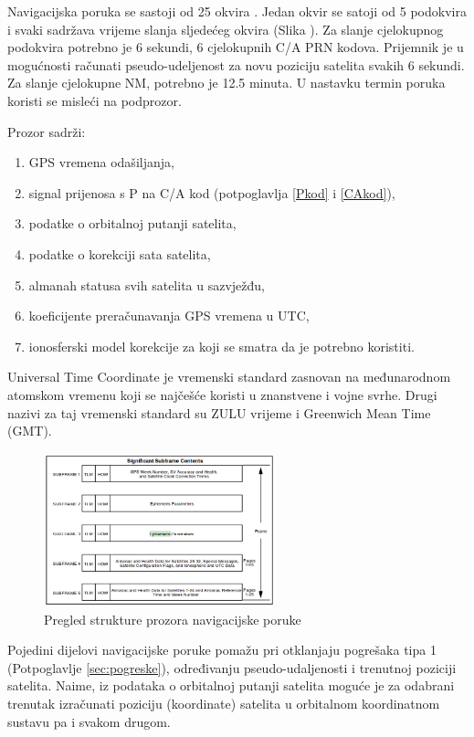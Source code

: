 \documentclass[a4paper,twoside,12pt]{memoir} %
\begin{document}
	Navigacijska poruka se sastoji od 25 okvira \cite{bookProcessing}.
	Jedan okvir se satoji od 5 podokvira i svaki sadržava vrijeme slanja
	sljedećeg okvira (Slika \cite{GPS:1}). Za slanje cjelokupnog podokvira potrebno je 6 sekundi,
	6 cjelokupnih C/A PRN kodova. Prijemnik je u mogućnosti računati pseudo-udeljenost za novu poziciju satelita svakih
	6 sekundi.
	Za slanje cjelokupne NM, potrebno je 12.5 minuta.
	U nastavku termin poruka koristi se misleći na podprozor.
	\vspace{0.5cm}
	
	Prozor sadrži:
	\begin{enumerate}
		\item GPS vremena odašiljanja,
		\item signal prijenosa s P na C/A kod (potpoglavlja \ref{Pkod} i \ref{CAkod}),
		\item podatke o orbitalnoj putanji satelita,
		\item podatke o korekciji sata satelita,
		\item almanah statusa svih satelita u sazvježđu,
		\item koeficijente preračunavanja GPS vremena u UTC,
		\item ionosferski model korekcije za koji se smatra da je potrebno koristiti.
	\end{enumerate}
	
	\begin{defn}
		Universal Time Coordinate je vremenski standard zasnovan na međunarodnom atomskom vremenu koji se najčešće koristi u znanstvene i vojne svrhe. Drugi nazivi za taj vremenski standard su ZULU vrijeme i Greenwich Mean Time (GMT).
	\end{defn}
	
	\begin{figure}[H]
		\centering
		\includegraphics[width=0.6\textwidth]{NACONTENT}
		\caption{Pregled strukture prozora navigacijske poruke\cite{GPS:1}}
		\label{Fig:aaa}
	\end{figure}
	Pojedini dijelovi navigacijske poruke pomažu pri otklanjaju pogrešaka tipa 1  
	(Potpoglavlje \ref{sec:pogreske}), određivanju
	pseudo-udaljenosti i trenutnoj poziciji satelita.
	Naime, iz podataka o orbitalnoj putanji satelita moguće je za odabrani trenutak izračunati poziciju (koordinate) satelita u orbitalnom koordinatnom sustavu pa i svakom drugom.
	 
\end{document}
